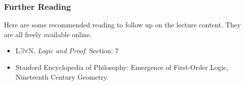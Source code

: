 \documentclass{beamer}
\begin{document}
\begin{frame}
	\frametitle{Further Reading}
	
	Here are some recommended reading to follow up on the lecture content. They are all freely available online. 
	
	\vspace{0.5cm}
	
	\begin{itemize}
		\item L$\exists \forall$N, \emph{Logic and Proof}. Section: 7
		\item Stanford Encyclopedia of Philosophy: Emergence of First-Order Logic, Nineteenth Century Geometry.
	\end{itemize}
	
\end{frame}
\end{document}
